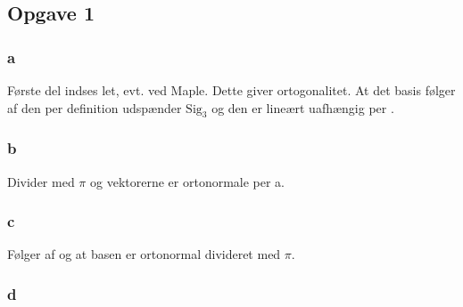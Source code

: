 		\subsection{Opgave 1}

			\subsubsection{a}

				Første del indses let, evt. ved Maple. Dette giver ortogonalitet. At det basis følger af den per definition udspænder $\text{Sig}_3$ og den er lineært uafhængig per \cite[Definition 4.3.4]{hesselholt2017}.

			\subsubsection{b}

				Divider med $\pi$ og vektorerne er ortonormale per a.

			\subsubsection{c}

				Følger af \cite[Sætning 6.2.6]{hesselholt2017} og at basen er ortonormal divideret med $\pi$.


			\subsubsection{d}

				












	



